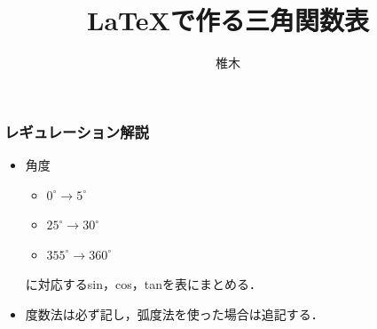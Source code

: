 \documentclass{beamer}
\title{\LaTeX で作る三角関数表}
\author{椎木}
\begin{document}
\begin{frame}
    \titlepage
\end{frame}

\begin{frame}
\frametitle{レギュレーション解説}
\begin{itemize}
\setlength{\itemsep}{1cm}
\item 角度
\begin{itemize}
\item $0^\circ\rightarrow 5^\circ$
\item $25^\circ\rightarrow 30^\circ$
\item $355^\circ\rightarrow 360^\circ$
\end{itemize}
に対応するsin，cos，tanを表にまとめる．
\item 度数法は必ず記し，弧度法を使った場合は追記する．
\end{itemize}
\end{frame}
\end{document}
